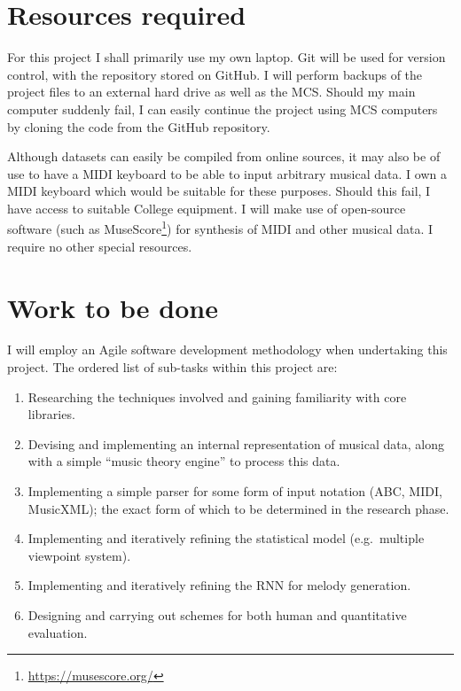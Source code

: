 \documentclass[12pt,a4paper,twoside]{article}
\begin{document}
\section{Resources required}

For this project I shall primarily use my own laptop. Git will be used for
version control, with the repository stored on GitHub. I will perform backups of
the project files to an external hard drive as well as the MCS. Should my main
computer suddenly fail, I can easily continue the project using MCS computers by
cloning the code from the GitHub repository.

Although datasets can easily be compiled from online sources, it may also be of
use to have a MIDI keyboard to be able to input arbitrary musical data. I own a
MIDI keyboard which would be suitable for these purposes. Should this fail, I
have access to suitable College equipment. I will make use of open-source
software (such as MuseScore\footnote{\url{https://musescore.org/}}) for
synthesis of MIDI and other musical data. I require no other special resources.

\section{Work to be done}

I will employ an Agile software development methodology when undertaking this
project. The ordered list of sub-tasks within this project are:
\begin{enumerate}

\item Researching the techniques involved and gaining familiarity with
  core libraries.

\item Devising and implementing an internal representation of musical data,
	along with a simple ``music theory engine'' to process this data.  

\item Implementing a simple parser for some form of input notation (ABC, MIDI,
  MusicXML); the exact form of which to be determined in the research phase.  

\item Implementing and iteratively refining the statistical model (e.g.\
  multiple viewpoint system).

\item Implementing and iteratively refining the RNN for melody generation.  

\item Designing and carrying out schemes for both human and quantitative
  evaluation.

\end{enumerate}
\end{document}
